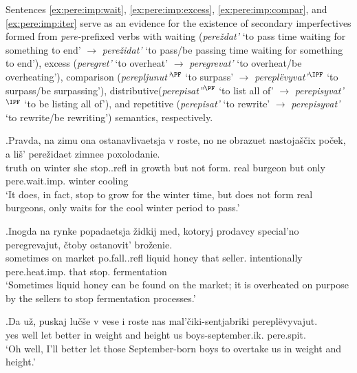 Sentences \ref{ex:pere:imp:wait}, \ref{ex:pere:imp:excess}, \ref{ex:pere:imp:compar}, and \ref{ex:pere:imp:iter} serve as an evidence for the existence of secondary imperfectives formed from \textit{pere-}prefixed verbs with waiting (\textit{pere\v{z}dat'} `to pass time waiting for something to end' $\rightarrow$ \textit{pere\v{z}idat'}  `to pass/be passing time waiting for something to end'), excess (\textit{peregret'} `to overheat' $\rightarrow$ \textit{peregrevat'} `to overheat/be overheating'), comparison (\textit{perepljunut'$^{\PF}$} `to surpass' $\rightarrow$ \textit{perepl\"{e}vyvat'$^{\IPF}$} `to surpass/be surpassing'), distributive(\textit{perepisat''$^{\PF}$} `to list all of' $\rightarrow$ \textit{perepisyvat'$^{\IPF}$} `to be listing all of'), and repetitive (\textit{perepisat'} `to rewrite' $\rightarrow$ \textit{perepisyvat'} `to rewrite/be rewriting') semantics, respectively.

\exg.\label{ex:pere:imp:wait}Pravda, na zimu ona ostanavlivaetsja v roste, no ne obrazuet nastoja\v{s}\v{c}ix po\v{c}ek, a li\v{s}' pere\v{z}idaet zimnee poxolodanie.\\
truth on winter she stop..refl in growth but not form. real burgeon but only pere.wait.imp. winter cooling\\
\trans `It does, in fact, stop to grow for the winter time, but does not form real burgeons, only waits for the cool winter period to pass.'\\

\exg.\label{ex:pere:imp:excess}Inogda na rynke popadaetsja \v{z}idkij med, kotoryj prodavcy special'no peregrevajut, \v{c}toby ostanovit' bro\v{z}enie.\\
sometimes on market po.fall..refl liquid honey that seller. intentionally pere.heat.imp. that stop. fermentation\\
`Sometimes liquid honey can be found on the market; it is overheated on purpose by the sellers to stop fermentation processes.'\\

\exg.\label{ex:pere:imp:compar}Da u\v{z}, puskaj lu\v{c}\v{s}e v vese i roste nas mal'\v{c}iki-sentjabriki perepl\"{e}vyvajut.\\
yes well let better in weight and height us boys-september.ik. pere.spit.\\
\trans `Oh well, I'll better let those September-born boys to overtake us in weight and height.'

